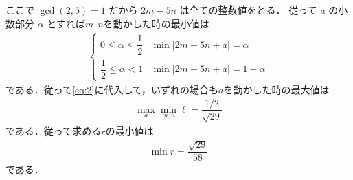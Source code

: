 \documentclass[../../main.tex]{subfiles}
\begin{document}
ここで $\gcd(2,5)=1$ だから $2m-5n$ は全ての整数値をとる．
従って $a$ の小数部分 $\alpha$ とすれば$m,n$を動かした時の最小値は
\begin{align}
  \begin{cases}
    0\le \alpha \le \dfrac{1}{2} &\min |2m-5n+a|=\alpha \\
    \dfrac{1}{2} \le \alpha<1     &\min |2m-5n+a|=1-\alpha
  \end{cases}
\end{align}
である．従って\cref{eq:2}に代入して，いずれの場合も$a$を動かした時の最大値は
\begin{align}
  \max_{a} \min_{m,n} \ell = \dfrac{1/2}{\sqrt{29}}
\end{align}
である．従って求める$r$の最小値は
\begin{align}
  \min r = \dfrac{\sqrt{29}}{58}
\end{align}
である．

\newpage
\end{document}
